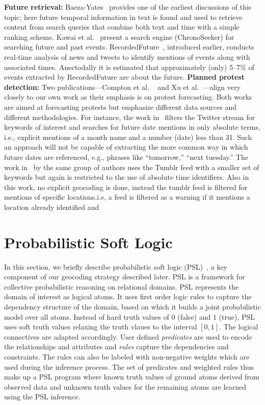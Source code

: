 \documentclass[letterpaper]{article}
\begin{document}
{\bf Future retrieval:}
Baeza-Yates~\cite{baeza2005searching} provides one of the earliest discussions
of this topic; here future temporal information in text is found and used to retrieve content from search queries that 
combine both text and time with a simple ranking scheme. 
Kawai et al.~\cite{Kawai:2010:CSE} present a search engine (ChronoSeeker) for searching 
future and past events.
RecordedFuture~\cite{recordedFuture}, introduced earlier, conducts
real-time analysis of news and tweets to identify mentions of events along with associated times. Anectodally it 
is estimated that approximately (only) 5--7\% of events extracted 
by RecordedFuture are about the future.
{\bf Planned protest detection:}
Two publications---Compton et al. ~\cite{compton2013detecting} and Xu et al.~\cite{xu2014civil}---align very closely to our own work as their emphasis is on protest forecasting.
Both works are aimed at forecasting protests
but emphasize different data sources and different methodologies. For instance, the work in~\cite{compton2013detecting} filters the Twitter stream for
keywords of interest and searches for future date mentions in only absolute terms, i.e., explicit mentions of a month name and a number (date)
less than 31. 
Such an approach will not be capable of extracting the more
common way in which future dates are referenced, e.g., phrases like
``tomorrow,'' ``next tuesday.'' 
The work in~\cite{xu2014civil} by the same group of authors uses the Tumblr feed with a smaller set of keywords but
again is restricted to the use of absolute time identifiers. Also in this work, no explicit geocoding is done, instead the tumblr feed is filtered for mentions of specific locations.i.e,
a feed is filtered as a warning if it mentions a location already identified and 

\vspace{-1em}
\section{Probabilistic Soft Logic}
\label{section:PSL}
In this section, we briefly describe probabilistic soft logic (PSL)~\cite{kimmig2012short}, a key
component of our geocoding strategy described later.
PSL is a framework for collective probabilistic reasoning on relational domains.
PSL represents the domain of interest as logical atoms.
It uses first order logic rules to capture the dependency structure of the domain, based on which it builds a joint probabilistic model over all atoms.
Instead of hard truth values of $0$ (false) and $1$ (true), PSL uses soft truth values relaxing the truth vlaues to the interval $[0,1]$.
The logical connectives are adapted accordingly.
User defined \emph{predicates} are used to encode the relationships and attributes and \emph{rules} capture the  dependencies and constraints.
The rules can also be
labeled with non-negative weights which are used during the inference process.
The set of predicates and weighted rules thus make up a PSL program where known truth values of ground atoms derived from observed data and unknown truth values for the remaining atoms are learned using the PSL inference.
\end{document}
